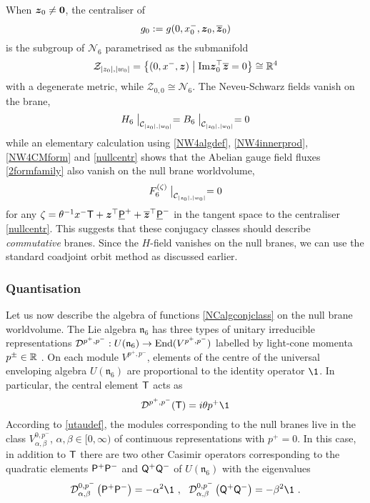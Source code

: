 When $\mz_0\neq{\mbf0}$, the centraliser of
\begin{equation*}
  g_0:=g(0,x^-_0, \mz_0,\overline{\mz}_0)
\end{equation*}
is the subgroup of $\mathcal{N}_6$ parametrised as the submanifold
\begin{equation}
  \label{nullcentr}
  \mathcal{Z}_{|z_0|,|w_0|}=\left\{(0 , x^- , \mz)\bigm|
  {\rm Im}\mz_0^\top \overline{\mz}=0\right\}\cong\R^4
\end{equation}
with a degenerate metric, while $\mathcal{Z}_{0,0}\cong\mathcal{N}_6$. The
Neveu-Schwarz fields vanish on the brane,
\begin{equation}
  \label{H6B6null0}
  H_6\bigm|_{\mathcal{C}_{|z_0|,|w_0|}}=
  B_6\bigm|_{\mathcal{C}_{|z_0|,|w_0|}}=0
\end{equation}
while an elementary calculation using \eqref{NW4algdef}, \eqref{NW4innerprod},
\eqref{NW4CMform} and \eqref{nullcentr} shows that the Abelian gauge field
fluxes \eqref{2formfamily} also vanish on the null brane worldvolume,
\begin{equation}
  \label{nullF60}
  F^{(\zeta)}_6\bigm|_{\mathcal{C}_{|z_0|,|w_0|}}=0
\end{equation}
for any $\zeta=\theta^{-1} x^- \T+\mz^\top \underline{\P}^++ \overline{\mz}^{
  \top} \underline{\P}^-$ in the tangent space to the centraliser
\eqref{nullcentr}. This suggests that these conjugacy classes should describe
{\it commutative} branes. Since the $H$-field vanishes on the null branes, we
can use the standard coadjoint orbit method as discussed earlier.

\subsubsection{Quantisation}
Let us now describe the algebra of functions \eqref{NCalgconjclass} on the null
brane worldvolume. The Lie algebra $\mathfrak{n}_6$ has three types of unitary
irreducible representations $\mathcal{D}^{p^+,p^-}:U(\mathfrak{n}_6)\to{\rm
  End}(V^{p^+,p^-})$ labelled by light-cone momenta $p^\pm\in\R$
\cite{BAKZ1,CFS1,KK1}. On each module $V^{p^+,p^-}$, elements of the centre of
the universal enveloping algebra $U(\mathfrak{n}_6)$ are proportional to the
identity operator $\1$. In particular, the central element $\T$ acts as
\begin{equation}
  \label{Tirrepgen}
  \mathcal{D}^{p^+,p^-}(\T)= i\theta p^+ \1
\end{equation}
According to \eqref{utaudef}, the modules corresponding to the null branes live
in the class $V^{0,p^-}_{\alpha,\beta}$, $\alpha,\beta\in[0,\infty)$ of
continuous representations with $p^+=0$. In this case, in addition to $\T$ there
are two other Casimir operators corresponding to the quadratic elements $\P^+
\P^-$ and $\Q^+ \Q^-$ of $U(\mathfrak{n}_6)$ with the eigenvalues
\begin{equation}
  \label{otherCasimirs}
  \mathcal{D}^{0,p^-}_{\alpha,\beta}\left(\P^+ \P^-\right)=-\alpha^2 \1 \ , ~~
  \mathcal{D}^{0,p^-}_{\alpha,\beta}\left(\Q^+ \Q^-\right)=-\beta^2 \1 \ .
\end{equation}

